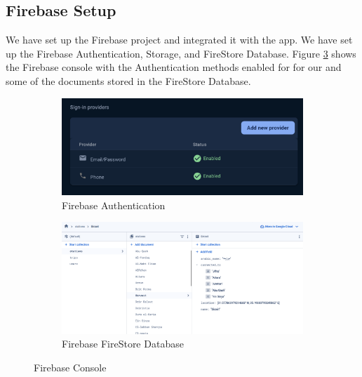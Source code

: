 \documentclass[a4paper, 12pt]{report} %
\begin{document}
        \pagebreak
        \subsection{Firebase Setup}
            We have set up the Firebase project and integrated it with the app. We have set up the Firebase Authentication, Storage, and FireStore Database. Figure \ref{fig:firebase_setup} shows the Firebase console with the Authentication methods enabled for for our and some of the documents stored in the FireStore Database.
            \begin{figure}[H]
                \centering
                \begin{subfigure}{0.7\textwidth}
                    \includegraphics[width=\linewidth]{Images/firebase_auth.png}
                    \caption{Firebase Authentication}
                    \label{fig:firebase_auth}
                \end{subfigure}
                \begin{subfigure}{0.7\textwidth}
                    \includegraphics[width=\linewidth]{Images/firestore.png}
                    \caption{Firebase FireStore Database}
                    \label{fig:firebase_database}
                \end{subfigure}
                \caption{Firebase Console}
                \label{fig:firebase_setup}
            \end{figure}
        
\end{document}
